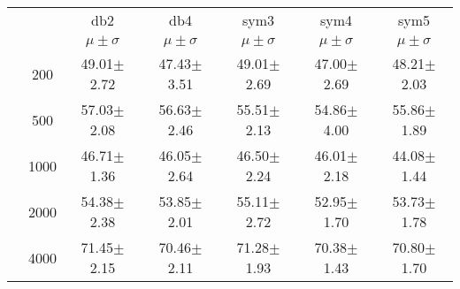 \begin{table}[H]
\begin{tabular}{|c|c|c c c c c|}
\multicolumn{2}{c|}{}  & db2 & db4 & sym3 & sym4 & sym5 \\\cline{3-7}
\multicolumn{2}{c|}{}& $\mu \pm \sigma$ & $\mu \pm \sigma$ & $\mu \pm \sigma$ & $\mu \pm \sigma$ & $\mu \pm \sigma$ \\\hline

\multicolumn{1}{|c|}{ \multirow{5}{*}{\rotatebox[origin=c]{90}{\textbf{Neurônios}}} }
&200	&49.01$\pm$2.72	&47.43$\pm$3.51	&49.01$\pm$2.69	&47.00$\pm$2.69	&48.21$\pm$2.03\\\cline{2-7}
&500	&57.03$\pm$2.08	&56.63$\pm$2.46	&55.51$\pm$2.13	&54.86$\pm$4.00	&55.86$\pm$1.89\\\cline{2-7}
&1000	&46.71$\pm$1.36	&46.05$\pm$2.64	&46.50$\pm$2.24	&46.01$\pm$2.18	&44.08$\pm$1.44\\\cline{2-7}
&2000	&54.38$\pm$2.38	&53.85$\pm$2.01	&55.11$\pm$2.72	&52.95$\pm$1.70	&53.73$\pm$1.78\\\cline{2-7}
&4000	&71.45$\pm$2.15	&70.46$\pm$2.11	&71.28$\pm$1.93	&70.38$\pm$1.43	&70.80$\pm$1.70


\\\midrule
	\end{tabular}

\end{table} %

